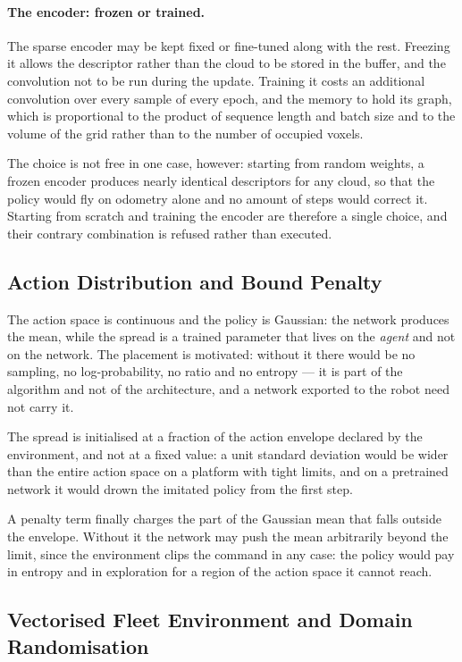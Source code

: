 \paragraph{The encoder: frozen or trained.}
The sparse encoder may be kept fixed or fine-tuned along with the rest. Freezing it
allows the descriptor rather than the cloud to be stored in the buffer, and the
convolution not to be run during the update. Training it costs an additional
convolution over every sample of every epoch, and the memory to hold its graph,
which is proportional to the product of sequence length and batch size and to
the volume of the grid rather than to the number of occupied voxels.

The choice is not free in one case, however: starting from random weights, a
frozen encoder produces nearly identical descriptors for any cloud, so that the
policy would fly on odometry alone and no amount of steps would correct it.
Starting from scratch and training the encoder are therefore a single choice,
and their contrary combination is refused rather than executed.

\subsection{Action Distribution and Bound Penalty}
\label{sec:rl-actions}

The action space is continuous and the policy is Gaussian: the network produces
the mean, while the spread is a trained parameter that lives on the \emph{agent}
and not on the network. The placement is motivated: without it there would be no
sampling, no log-probability, no ratio and no entropy --- it is part of the
algorithm and not of the architecture, and a network exported to the robot need
not carry it.

The spread is initialised at a fraction of the action envelope declared by the
environment, and not at a fixed value: a unit standard deviation would be wider
than the entire action space on a platform with tight limits, and on a
pretrained network it would drown the imitated policy from the first step.

A penalty term finally charges the part of the Gaussian mean that falls outside
the envelope. Without it the network may push the mean arbitrarily beyond the
limit, since the environment clips the command in any case: the policy would pay
in entropy and in exploration for a region of the action space it cannot reach.

\subsection{Vectorised Fleet Environment and Domain Randomisation}
\label{sec:rl-environment}


